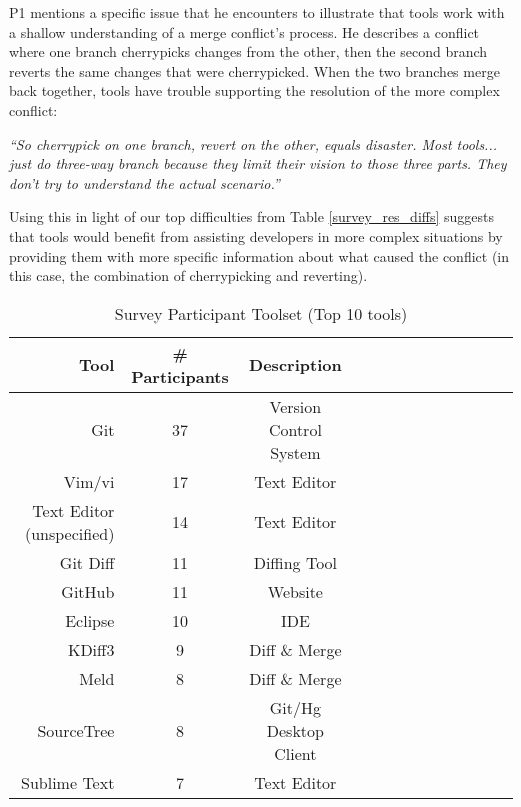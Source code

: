  P1 mentions a specific issue that he encounters to illustrate that tools work with a shallow understanding of a merge conflict's process. He describes a conflict where one branch cherrypicks changes from the other, then the second branch reverts the same changes that were cherrypicked. When the two branches merge back together, tools have trouble supporting the resolution of the more complex conflict:
 \begin{displayquote}
 \textit{``So cherrypick on one branch, revert on the other, equals disaster. Most tools... just do three-way branch because they limit their vision to those three parts. They don't try to understand the actual scenario.''}
 \end{displayquote}
 Using this in light of our top difficulties from Table \ref{survey_res_diffs} suggests that tools would benefit from assisting developers in more complex situations by providing them with more specific information about what caused the conflict (in this case, the combination of cherrypicking and reverting).

\begin{table}[!]
\renewcommand{\arraystretch}{1.3}
\caption{Survey Participant Toolset (Top 10 tools)}
\label{survey_toolset}
\centering
\begin{tabularx}{0.45\textwidth}{@{}r|*{10}{C}c@{}c@{}}
\toprule
Tool & \# Participants & Description\\
\midrule
Git	& 37 & Version Control System\\
Vim/vi & 17 & Text Editor\\
Text Editor (unspecified) & 14 & Text Editor\\
Git Diff & 11 & Diffing Tool\\
GitHub & 11 & Website\\
Eclipse & 10 & IDE\\
KDiff3 & 9 & Diff \& Merge\\
Meld & 8 & Diff \& Merge\\
SourceTree & 8 & Git/Hg Desktop Client\\
Sublime Text & 7 & Text Editor\\
\bottomrule
\end{tabularx}
\end{table}